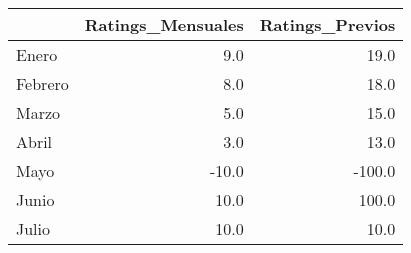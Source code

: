 \begin{tabular}{lrr}
\toprule
{} &  Ratings\_Mensuales &  Ratings\_Previos \\
\midrule
Enero   &                9.0 &             19.0 \\
Febrero &                8.0 &             18.0 \\
Marzo   &                5.0 &             15.0 \\
Abril   &                3.0 &             13.0 \\
Mayo    &              -10.0 &           -100.0 \\
Junio   &               10.0 &            100.0 \\
Julio   &               10.0 &             10.0 \\
\bottomrule
\end{tabular}
